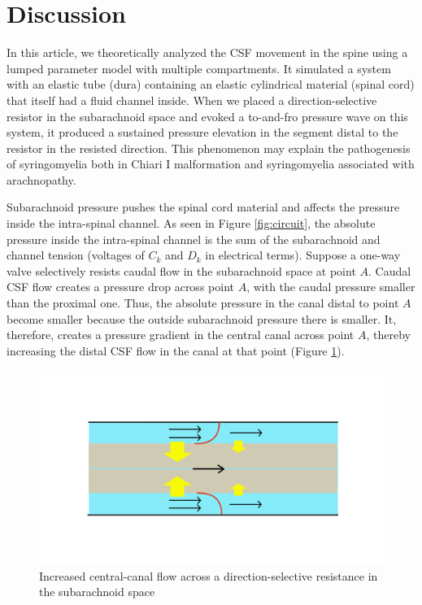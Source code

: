 \documentclass[fleqn,10pt]{wlscirep}
\begin{document}
\section*{Discussion}

In this article, we theoretically analyzed the CSF movement in the spine
using a lumped parameter model with multiple compartments. It simulated a
system with an elastic tube (dura) containing an elastic cylindrical
material (spinal cord) that itself had a fluid channel inside.  When we
placed a direction-selective resistor in the subarachnoid space and evoked
a to-and-fro pressure wave on this system, it produced a sustained pressure
elevation in the segment distal to the resistor in the resisted direction.
This phenomenon may explain the pathogenesis of syringomyelia both in
Chiari I malformation and syringomyelia associated with arachnopathy.

Subarachnoid pressure pushes the spinal cord material and affects the
pressure inside the intra-spinal channel. As seen in Figure
\ref{fig:circuit}, the absolute pressure inside the intra-spinal channel is
the sum of the subarachnoid and channel tension (voltages of $C_k$ and
$D_k$ in electrical terms).  Suppose a one-way valve selectively resists
caudal flow in the subarachnoid space at point $A$. Caudal CSF flow creates
a pressure drop across point $A$, with the caudal pressure smaller than the
proximal one. Thus, the absolute pressure in the canal distal to point $A$
become smaller because the outside subarachnoid pressure there is smaller.
It, therefore, creates a pressure gradient in the central canal across
point $A$, thereby increasing the distal CSF flow in the canal at that
point (Figure \ref{fig:pump_close}).

\begin{figure}[hbt]
    \centering
    \includegraphics[width=\textwidth]{pumping_mechanism_close.jpg}
    \caption{Increased central-canal flow across a direction-selective
    resistance in the subarachnoid space}
    \label{fig:pump_close}
\end{figure}
\end{document}
